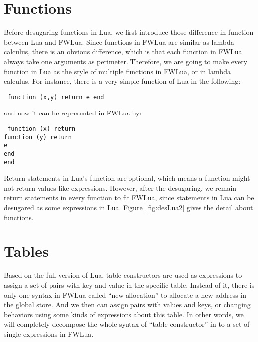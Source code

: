 \section{Functions}\label{sec:TraFunc}
Before desugaring functions in Lua, we first introduce those difference in function between Lua and FWLua. Since functions in FWLua are similar as lambda calculus, there is an obvious difference, which is that each function in FWLua always take one arguments as perimeter. Therefore, we are going to make every function in Lua as the style of multiple functions in FWLua, or in lambda calculus. For instance, there is a very simple function of Lua in the following:
\begin{flushleft}
{\tt
function (x,y) return e end
}
\end{flushleft}
and now it can be represented in FWLua by:
\begin{flushleft}
{\tt
function (x) return \\
\quad  function (y) return \\
\quad\quad e \\
\quad end \\
end \\
}
\end{flushleft}

Return statements in Lua's function are optional, which means a function might not return values like expressions. However, after the desugaring, we remain return statements in every function to fit FWLua, since statements in Lua can be desugared as some expressions in Lua. Figure~\ref{fig:desLua2} gives the detail about functions.


\section{Tables}\label{sec:TranslateTabls}
Based on the full version of Lua, table constructors are used as expressions to assign a set of pairs with key and value in the specific table. Instead of it, there is only one syntax in FWLua called ``new allocation'' to allocate a new address in the global store. And we then can assign pairs with values and keys, or changing behaviors using some kinds of expressions about this table. In other words, we will completely decompose the whole syntax of ``table constructor'' in to a set of single expressions in FWLua. 


